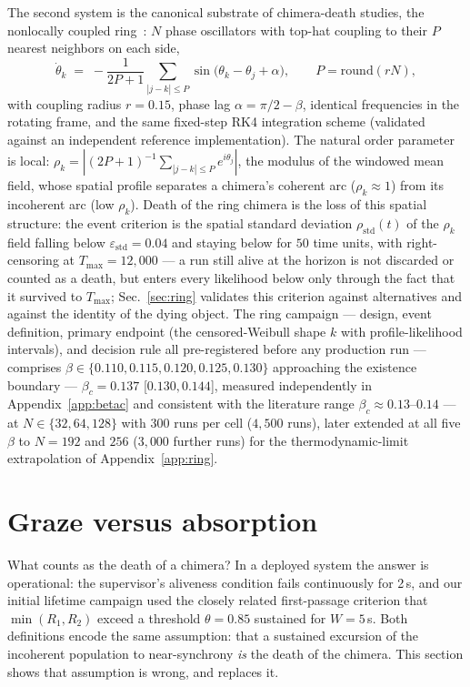 \documentclass[pdflatex,sn-mathphys,Numbered]{sn-jnl}
\begin{document}
The second system is the canonical substrate of chimera-death studies, the
nonlocally coupled ring~\cite{kb2002,wo2011}: $N$ phase oscillators with top-hat
coupling to their $P$ nearest neighbors on each side,
\begin{equation}
\dot\theta_k \;=\; -\frac{1}{2P+1} \sum_{|j-k|\le P}
\sin\!\big(\theta_k - \theta_j + \alpha\big),
\qquad P = \mathrm{round}(rN),
\label{eq:ring}
\end{equation}
with coupling radius $r = 0.15$, phase lag $\alpha = \pi/2 - \beta$, identical
frequencies in the rotating frame, and the same fixed-step RK4 integration scheme
(validated against an independent reference implementation). The natural order
parameter is local: $\rho_k = |(2P+1)^{-1} \sum_{|j-k| \le P} e^{i\theta_j}|$, the
modulus of the windowed mean field, whose spatial profile separates a chimera's
coherent arc ($\rho_k \approx 1$) from its incoherent arc (low $\rho_k$). Death of
the ring chimera is the loss of this spatial structure: the event criterion is the
spatial standard deviation $\rho_{\mathrm{std}}(t)$ of the $\rho_k$ field falling
below $\varepsilon_{\mathrm{std}} = 0.04$ and staying below for $50$ time units,
with right-censoring at $T_{\max} = 12{,}000$ --- a run still alive at the horizon
is not discarded or counted as a death, but enters every likelihood below only
through the fact that it survived to $T_{\max}$; Sec.~\ref{sec:ring} validates this
criterion against alternatives and against the identity of the dying object. The
ring campaign --- design, event definition, primary endpoint (the censored-Weibull
shape $k$ with profile-likelihood intervals), and decision rule all pre-registered
before any production run --- comprises
$\beta \in \{0.110, 0.115, 0.120, 0.125, 0.130\}$ approaching the existence
boundary --- $\beta_c = 0.137$ [$0.130, 0.144$], measured independently in
Appendix~\ref{app:betac} and consistent with the literature range
$\beta_c \approx 0.13$--$0.14$ --- at $N \in \{32, 64, 128\}$ with $300$ runs
per cell ($4{,}500$ runs), later extended at all five $\beta$ to $N = 192$ and
$256$ ($3{,}000$ further runs) for the thermodynamic-limit extrapolation of
Appendix~\ref{app:ring}.

\section{Graze versus absorption}\label{sec:graze}

What counts as the death of a chimera? In a deployed system the answer is
operational: the supervisor's aliveness condition fails continuously for 2\,s, and
our initial lifetime campaign used the closely related first-passage criterion that
$\min(R_1, R_2)$ exceed a threshold $\theta = 0.85$ sustained for $W = 5$\,s. Both
definitions encode the same assumption: that a sustained excursion of the incoherent
population to near-synchrony \emph{is} the death of the chimera. This section shows
that assumption is wrong, and replaces it.
\end{document}
